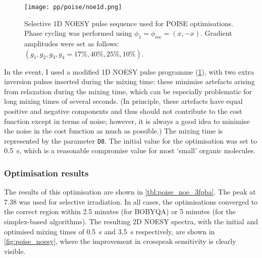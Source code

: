 \begin{figure}[!ht]
    \centering
    \texttt{[image: pp/poise/noe1d.png]}%
    \caption[1D NOESY pulse sequence used for optimisations]{
        Selective 1D NOESY pulse sequence used for POISE optimisations.
        Phase cycling was performed using $\phi_1 = \phi_\text{rec} = (x, -x)$.
        Gradient amplitudes were set as follows: $(g_1, g_2, g_3, g_4 = 17\%, 40\%, 25\%, 10\%)$.
    }
    \label{fig:noe1d_pulseq}
\end{figure}

In the event, I used a modified 1D NOESY pulse programme (\cref{fig:noe1d_pulseq}), with two extra inversion pulses inserted during the mixing time: these minimise artefacts arising from relaxation during the mixing time, which can be especially problematic for long mixing times of several seconds.
(In principle, these artefacts have equal positive and negative components and thus should not contribute to the cost function except in terms of noise; however, it is always a good idea to minimise the noise in the cost function as much as possible.)
The mixing time is represented by the parameter \texttt{D8}.
The initial value for the optimisation was set to \qty{0.5}{\s}, which is a reasonable compromise value for most `small' organic molecules.

\subsubsection{Optimisation results}

The results of this optimisation are shown in \cref{tbl:poise_noe_3fpba}.
The peak at \qty{7.38}{\ppm} was used for selective irradiation.
In all cases, the optimisations converged to the correct region within 2.5 minutes (for BOBYQA) or 5 minutes (for the simplex-based algorithms).
The resulting 2D NOESY spectra, with the initial and optimised mixing times of \qty{0.5}{\s} and \qty{3.5}{\s} respectively, are shown in \cref{fig:poise_noesy}, where the improvement in crosspeak sensitivity is clearly visible.

